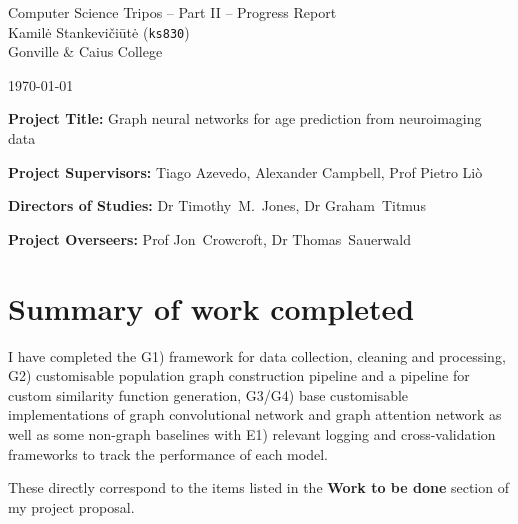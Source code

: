 \documentclass[10pt]{article}
\begin{document}
\begin{center}
\Large
Computer Science Tripos -- Part II -- Progress Report\\[4mm]
\large
Kamilė Stankevičiūtė (\texttt{ks830}) \\ Gonville \& Caius College

\today %
\end{center}

\vspace{5mm}

\textbf{Project Title:} Graph neural networks for age prediction from neuroimaging data

\textbf{Project Supervisors:} Tiago Azevedo, Alexander Campbell, Prof Pietro Liò

\textbf{Directors of Studies:} Dr Timothy~M.~Jones, Dr Graham~Titmus

\textbf{Project Overseers:} Prof Jon~Crowcroft, Dr Thomas~Sauerwald

\section*{Summary of work completed}

I have completed the G1) framework for data collection, cleaning and processing, G2) customisable population graph construction pipeline and a pipeline for custom similarity function generation, G3/G4) base customisable implementations of graph convolutional network and graph attention network as well as some non-graph baselines with E1) relevant logging and cross-validation frameworks to track the performance of each model. 

These directly correspond to the items listed in the \textbf{Work to be done} section of my project proposal.
\end{document}
